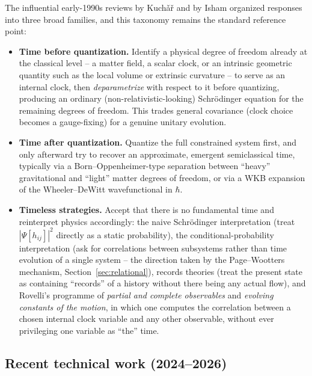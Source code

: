 \documentclass[11pt]{article}
\begin{document}
The influential early-1990s reviews by Kuch\v a\v r and by Isham organized responses into three broad families, and this taxonomy remains the standard reference point:
\begin{itemize}
\item \textbf{Time before quantization.} Identify a physical degree of freedom already at the classical level -- a matter field, a scalar clock, or an intrinsic geometric quantity such as the local volume or extrinsic curvature -- to serve as an internal clock, then \emph{deparametrize} with respect to it before quantizing, producing an ordinary (non-relativistic-looking) Schr\"odinger equation for the remaining degrees of freedom. This trades general covariance (clock choice becomes a gauge-fixing) for a genuine unitary evolution.
\item \textbf{Time after quantization.} Quantize the full constrained system first, and only afterward try to recover an approximate, emergent semiclassical time, typically via a Born--Oppenheimer-type separation between ``heavy'' gravitational and ``light'' matter degrees of freedom, or via a WKB expansion of the Wheeler--DeWitt wavefunctional in $\hbar$.
\item \textbf{Timeless strategies.} Accept that there is no fundamental time and reinterpret physics accordingly: the naive Schr\"odinger interpretation (treat $|\Psi[h_{ij}]|^2$ directly as a static probability), the conditional-probability interpretation (ask for correlations between subsystems rather than time evolution of a single system -- the direction taken by the Page--Wootters mechanism, Section~\ref{sec:relational}), records theories (treat the present state as containing ``records'' of a history without there being any actual flow), and Rovelli's programme of \emph{partial and complete observables} and \emph{evolving constants of the motion}, in which one computes the correlation between a chosen internal clock variable and any other observable, without ever privileging one variable as ``the'' time.
\end{itemize}

\subsection{Recent technical work (2024--2026)}
\end{document}
